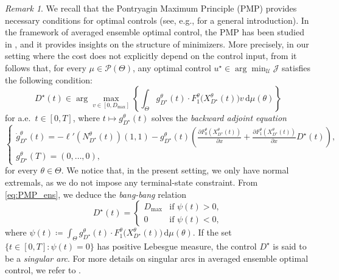 \documentclass[a4paper,12pt, reqno]{amsart}
\theoremstyle{plain}
\theoremstyle{definition}
\theoremstyle{remark}
\newtheorem{remark}{Remark}
\numberwithin{equation}{section}
\newcommand{\J}{\mathcal{J}}
\newcommand{\U}{\mathcal{U}}
\newcommand{\de}{\,\mathrm{d}}
\begin{document}
{ 
\begin{remark} \label{rmk:bang_bang}
    We recall that the Pontryagin Maximum Principle (PMP) provides necessary conditions for optimal controls (see, e.g., \cite[Section~6]{Bressan_Piccoli} for a general introduction).
    In the framework of averaged ensemble optimal control, the PMP has been studied in \cite{BK19}, and it provides insights on the structure of minimizers.
    More precisely, in our setting where the cost does not explicitly depend on the control input, from \cite[Theorem~3.3]{BK19} it follows that, for every $\mu \in \mathcal{P}(\Theta)$, any optimal control $u^\star\in \arg\min_\U \J$ satisfies the following condition:
    \begin{equation} \label{eq:PMP_ens}
        D^\star(t) \in \arg\max_{v\in [0,D_{\max}]} \left\{ \int_{\Theta} g^\theta_{D^\star}(t) \cdot F_1^\theta\big( X_{D^\star}^\theta(t) \big) v \de \mu(\theta) \right\}
    \end{equation}
    for a.e.~$t\in [0,T]$, where $t\mapsto g^\theta_{D^\star}(t)$ solves the \emph{backward adjoint equation}     
    \begin{equation*} 
        \begin{cases}
            \dot g_{D^\star}^\theta (t) = 
            -\ell' \left(N^\theta_{D^\star}(t) \right) (1,1) -g_{D^\star}^\theta(t) \left( \frac{\partial F_0^\theta (X_{D^\star}^\theta(t))}{\partial x} +
    \frac{\partial F_1^\theta (X_{D^\star}^\theta(t))}{\partial x} D^\star(t) \right),\\
        g_{D^\star}^\theta (T) = (0,\ldots,0),
        \end{cases}
    \end{equation*}
    for every $\theta\in\Theta$. We notice that, in the present setting, we only have normal extremals, as we do not impose any terminal-state constraint.
    From \cref{eq:PMP_ens}, we deduce the \emph{bang-bang} relation
    \begin{equation*}
        D^\star(t) = \begin{cases}
            D_{\max} & \mbox{if } \psi(t)>0, \\
            0 & \mbox{if } \psi(t)<0,
        \end{cases}
    \end{equation*}
    where $\psi(t) \coloneqq \int_{\Theta} g^\theta_{D^\star}(t) \cdot F_1^\theta\big( X_{D^\star}^\theta(t) \big) \de \mu(\theta)$. If the set $\{ t \in [0,T]: \psi(t) =0 \}$ has positive Lebesgue measure, the control $D^\star$ is said to be a \emph{singular arc}. For more details on singular arcs in averaged ensemble optimal control, we refer to \cite{aronna2025singular}.\\

\end{remark}}
\end{document}
